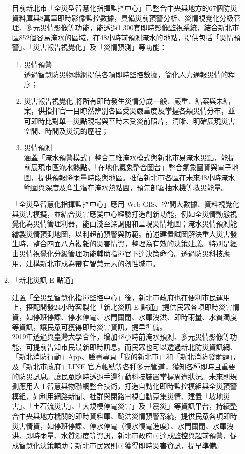 \documentclass[a4paper,12pt]{article}
\begin{document}
\begin{enumerate}
\begin{enumerate}
目前新北市「全災型智慧化指揮監控中心」已整合中央與地方的67個防災資料庫與8萬筆即時影像監控數據，具備災前預警分析、災情視覺化分級管理、多元災情影像等功能，能透過1,300套即時影像監視系統，結合新北市區852個容易淹水的區域，在48小時前預測淹水的地點，提供包括「災情預警」、「災害報告視覺化」及「災情預測」等功能：\\
\begin{enumerate}
\item 災情預警\\
透過智慧防災物聯網提供各項即時監控數據，簡化人力通報災情的程序；\\
\item 災害報告視覺化 將所有即時發生災情分成一般、嚴重、結案與未結案，供指揮官一目瞭然辨別各區受災嚴重度及掌握各類災情分布，並可即時比對單一災點現場與平時未受災前照片，清晰、明確展現災害空間、時間及災況的歷程；\\
\item 災情預測\\
涵蓋「淹水預警模式」整合二維淹水模式與新北市易淹水災點，能提前展現市區淹水熱點、「在地化氣象整合圖台」整合氣象圖資與電子地圖，提供預報降雨量時段與地區。推估新北市各區在未來48小時淹水範圍與深度及產生潛在淹水熱點圖，預先部署抽水機等救災能量。\\
\end{enumerate}
「全災型智慧化指揮監控中心」應用 Web-GIS、空間大數據、資料視覺化與災害模擬，並結合災害應變中心經驗打造創新功能，例如全災情動態視覺化為災情管理利器，能由淺至深調閱和呈現災情地圖；淹水災情預測能繪製災情預測地圖，以利超前預警與防範。前述建置試圖解決重大災害發生時，整合四面八方複雜的災害情資，整理為有效的決策建議。特別是經由災情視覺化分級管理功能輔助指揮官下達決策命令。透過防災科技應用，建構新北市成為帶有智慧元素的韌性城市。\\
\item 「新北災訊 E 點通」
\label{sec:org08ffa61}

建置「全災型智慧化指揮監控中心」後，新北市政府也在便利市民運用上，搭配開發24小時客製化「新北災訊 E 點通」提供民眾各項即時災害情資，如停班停課、停水停電、水門關閉、水庫洩洪、即時雨量、水質濁度等資訊，讓民眾可獲得即時災害資訊，提早準備。\\

2019年透過與臺灣大學合作，增加48小時前淹水預測、多元災情影像等功能，可提前告知市民最新即時訊息。而民眾也可以透過新北防災資訊網、「新北消防行動」App、臉書專頁「我的新北市」和「新北消防發爾麵」，及「新北市政府」LINE 官方帳號等各種多元管道，獲知各種即時且重要的防災訊息。讓民眾隨時透過手邊行動科技裝置掌握周遭狀況。未來則規劃應用人工智慧與物聯網整合技術，打造自動化即時監控模組與全災預警模組，如利用網路新聞、社群與閉路電視自動蒐集災情、建置「坡地災害」、「土石流災害」、「大規模停電災害」及「震災」等資訊平台，持續整合中央與地方機關的即時資料庫、颱洪災情預警系統，提供民眾各項即時災害情資，如停班停課、停水停電（復水復電進度）、水門關閉、水庫洩洪、即時雨量、水質濁度等資訊，新北市政府可達成監控與超前預警，促成智慧化決策輔助；新北市民眾則可獲得即時災害資訊，提早準備。\\


\end{enumerate}
\end{enumerate}
\end{document}
